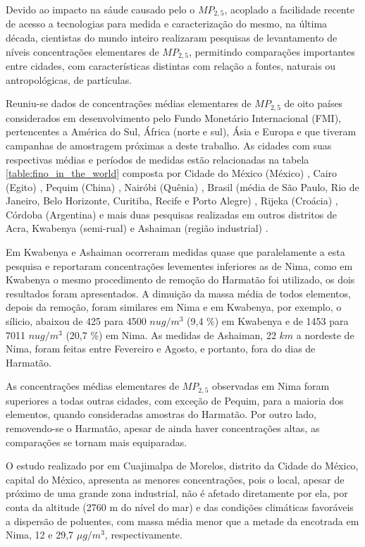 Devido ao impacto na sáude causado pelo o $MP_{2,5}$, acoplado a facilidade 
recente de acesso a tecnologias para medida e caracterização do mesmo, 
na última década, cientistas do mundo inteiro realizaram pesquisas de 
levantamento de níveis concentrações elementares de $MP_{2,5}$, permitindo
comparações importantes entre cidades, com características distintas com 
relação a fontes, naturais ou antropológicas, de partículas.

Reuniu-se dados de concentrações médias elementares de $MP_{2,5}$ de oito 
países considerados em desenvolvimento pelo Fundo Monetário Internacional (FMI),
pertencentes a América do Sul, África (norte e sul), Ásia e Europa e que tiveram
campanhas de amostragem próximas a deste trabalho. As cidades
com suas respectivas médias e períodos de medidas estão relacionadas na 
tabela \ref{table:fino_in_the_world} composta por  
Cidade do México (México) \citep{diaz2014},
Cairo (Egito) \citep{boman2013},
Pequim (China) \citep{yang2011},
Nairóbi (Quênia)  \citep{gaita2014},
Brasil (média de São Paulo, Rio de Janeiro, Belo Horizonte, Curitiba, 
Recife e Porto Alegre)  \citep{andrade2012urban},
Rijeka (Croácia) \citep{ivovsevic2015}, 
Córdoba (Argentina) \citep{achad2014} e mais duas pesquisas realizadas em 
outros distritos de Acra, Kwabenya (semi-rual) \citep{aboh2009} e Ashaiman
(região industrial) \citep{ofosu2012}. 

Em Kwabenya e Ashaiman ocorreram medidas quase que paralelamente a esta 
pesquisa e reportaram concentrações levementes inferiores as de Nima, como
em Kwabenya o mesmo procedimento de remoção do Harmatão foi utilizado, os dois 
resultados foram apresentados. A dimuição da massa média de todos elementos,
depois da remoção, foram similares em Nima e em Kwabenya, 
por exemplo, o sílicio, abaixou de 425 para 4500 $nu g/m^3$ 
(9,4 \%) em Kwabenya e de 1453 para 7011 $nu g/m^3$ (20,7 \%) em Nima. 
As medidas de Ashaiman, 22 $km$ a nordeste de Nima, foram feitas entre 
Fevereiro e Agosto, e portanto, fora do dias de Harmatão.

As concentrações médias elementares de $MP_{2,5}$ observadas em Nima foram 
superiores a todas outras cidades, com exceção de Pequim, 
para a maioria dos elementos, quando consideradas amostras do Harmatão.
Por outro lado, removendo-se o Harmatão, apesar de ainda haver concentrações
altas, as comparações se tornam mais equiparadas. 

O estudo realizado por \citet{diaz2014} em Cuajimalpa de Morelos, distrito 
da Cidade do México, capital do México, 
apresenta as menores concentrações, pois o local, apesar de próximo
de uma grande zona industrial, não é afetado diretamente por ela, por conta
da altitude (2760 m do nível do mar) e das condições climáticas favoráveis a
dispersão de poluentes, com massa média menor que a metade da encotrada em Nima, 
12 e 29,7 $\mu g/m^3$, respectivamente.

